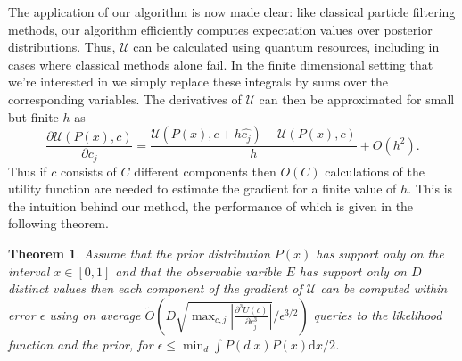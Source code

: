 \documentclass[aps,amsmath,onecolumn,amssymb]{revtex4}
\newtheorem{theorem}{Theorem}
\begin{document}
The application of our algorithm is now made clear: like classical particle
filtering methods, our algorithm efficiently computes expectation values over
posterior distributions. Thus, $\mathcal{U}$ can be calculated using quantum resources,
including in cases where classical methods alone fail.
In the finite dimensional setting that we're interested in we simply replace these integrals by sums over the corresponding variables.
The derivatives of $\mathcal{U}$ can then be approximated for small but finite $h$ as 
\begin{equation}
\frac{\partial \mathcal{U}(P(x),c)}{\partial c_j} = \frac{\mathcal{U}(P(x),c+h\hat{c_j})-\mathcal{U}(P(x),c)}{h} + O(h^2).
\end{equation}
Thus if $c$ consists of $C$ different components then $O(C)$ calculations of the utility function are needed to estimate the gradient for a finite value of $h$.
This is the intuition behind our method, the performance of which is given in the following theorem.
\begin{theorem}
Assume that the prior distribution $P(x)$ has support only on the interval $x\in [0,1]$ and that the observable varible $E$ has support only on $D$ distinct values then each component of the gradient of $\mathcal{U}$ can be computed within error $\epsilon$ using on average $\tilde{O}\left(D\sqrt{\max_{c,j}\left|\frac{\partial^3 U(c)}{\partial c_j^3} \right|}/\epsilon^{3/2}\right)$ queries to the likelihood function and the prior, for $\epsilon \le \min_d \int P(d|x)P(x) \mathrm{d}x/2$.
\end{theorem}
\end{document}
